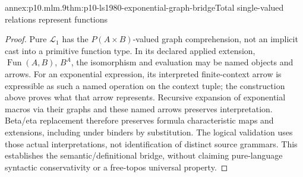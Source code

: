 \begin{annexitem}{annex:p10.mlm.9}{thm:p10-ls1980-exponential-graph-bridge}{Total single-valued relations represent functions}
\begin{proof}
Pure \(\mathcal L_1\) has the \(P(A\times B)\)-valued graph comprehension,
not an implicit cast into a primitive function type. In its declared
applied extension, \(\operatorname{Fun}(A,B)\), \(B^A\), the isomorphism and
evaluation may be named objects and arrows. For an exponential expression,
its interpreted finite-context arrow is expressible as such a named
operation on the context tuple; the construction above proves what that
arrow represents. Recursive expansion of exponential macros via their
graphs and these named arrows preserves interpretation. Beta/eta replacement
therefore preserves formula characteristic maps and extensions, including
under binders by substitution. The logical validation uses those actual
interpretations, not identification of distinct source grammars. This
establishes the semantic/definitional bridge, without claiming pure-language
syntactic conservativity or a free-topos universal property.
\end{proof}
\end{annexitem}
